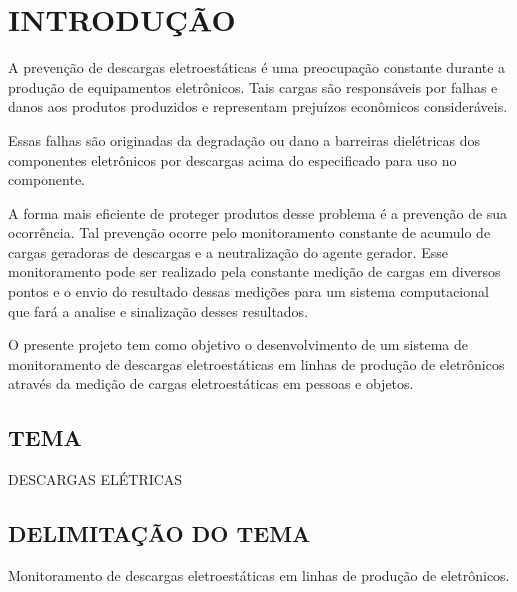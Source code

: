 \documentclass[
	12pt,				%
	openright,			%
	oneside,			%
	a4paper,			%
	chapter=TITLE,		%
	english,			%
	french,				%
	spanish,			%
	brazil,				%
	article,			%
	]{uea-abntex2}
\begin{document}
\textual
\pagestyle{simple}

\newpage

\chapter*{\vspace*{3.4cm}INTRODUÇÃO}
A prevenção de descargas eletroestáticas é uma preocupação constante durante a produção de equipamentos eletrônicos. Tais cargas são responsáveis por falhas e danos aos produtos produzidos e representam prejuízos econômicos consideráveis.

Essas falhas são originadas da degradação ou dano a barreiras dielétricas dos componentes eletrônicos por descargas acima do especificado para uso no componente.

A forma mais eficiente de proteger produtos desse problema é a prevenção de sua ocorrência. Tal prevenção ocorre pelo monitoramento constante de acumulo de cargas geradoras de descargas e a neutralização do agente gerador.
Esse monitoramento pode ser realizado pela constante medição de cargas em diversos pontos e o envio do resultado dessas medições para um sistema computacional que fará a analise e sinalização desses resultados. 

O presente projeto tem como objetivo o desenvolvimento de um sistema de monitoramento de descargas eletroestáticas em linhas de produção de eletrônicos através da medição de cargas eletroestáticas em pessoas e objetos.


\newpage

\vspace{24pt}
\section{TEMA}
DESCARGAS ELÉTRICAS
\section{DELIMITAÇÃO DO TEMA}
Monitoramento de descargas eletroestáticas em linhas de produção de eletrônicos.
\end{document}
